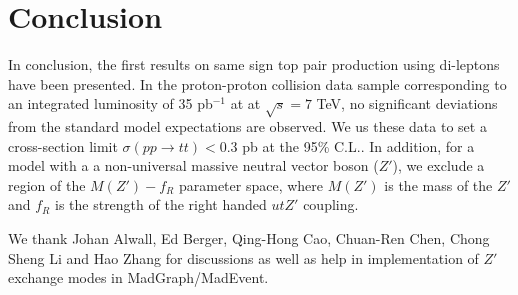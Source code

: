 \section{Conclusion}
\label{sec:conclusion}
In conclusion, the first results on same sign top pair production using 
di-leptons have been presented. 
In the proton-proton collision data sample corresponding to an 
integrated luminosity of 35 pb$^{-1}$ at at $\sqrt{s} = 7 $ TeV, 
no significant deviations from the standard model expectations are observed. 
We us these data to set a cross-section limit $\sigma(pp \to tt) < 0.3$ pb at the 95\% C.L..
In addition, for a model with a 
a non-universal massive neutral vector boson ($Z'$), we exclude 
a region of the $M(Z')-f_R$ parameter space, where $M(Z')$ is the mass of the $Z'$ 
and $f_R$ is the strength of the right handed $utZ'$ coupling.



\ack

We thank Johan Alwall, Ed Berger, Qing-Hong Cao, Chuan-Ren Chen, Chong Sheng Li and Hao Zhang for 
discussions as well as help in implementation of $Z'$ exchange modes in MadGraph/MadEvent. 


